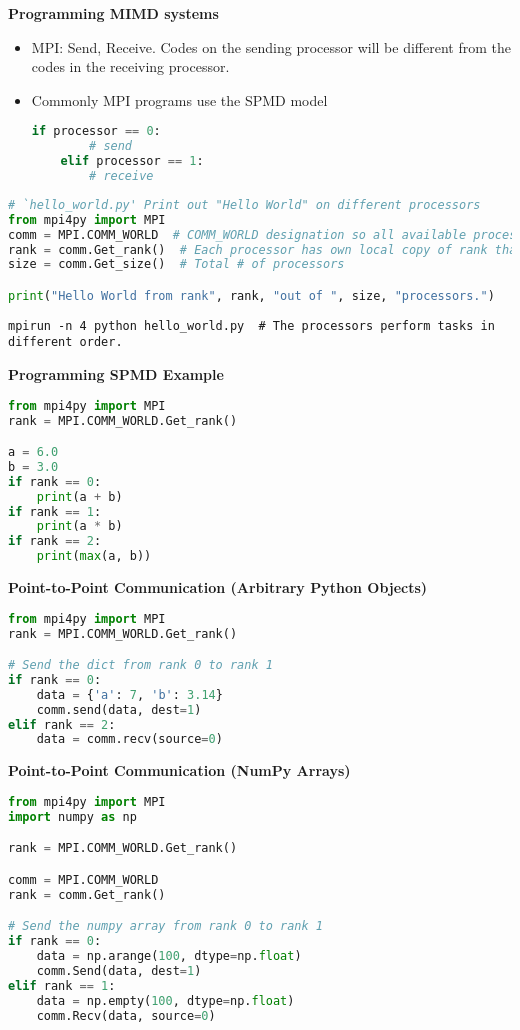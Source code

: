 \documentclass{article}
\begin{document}
\textbf{Programming MIMD systems}
\begin{itemize}
    \item MPI: Send, Receive. Codes on the sending processor will be different from the codes in the receiving processor.
    \item Commonly MPI programs use the SPMD model
    
    \begin{lstlisting}[language=Python]
    if processor == 0:
        # send
    elif processor == 1:
        # receive
    \end{lstlisting}
\end{itemize}

\begin{lstlisting}[language=Python]
# `hello_world.py' Print out "Hello World" on different processors
from mpi4py import MPI
comm = MPI.COMM_WORLD  # COMM_WORLD designation so all available processors communicate with each other 
rank = comm.Get_rank()  # Each processor has own local copy of rank that cannot be accessed by other processors 
size = comm.Get_size()  # Total # of processors

print("Hello World from rank", rank, "out of ", size, "processors.")
\end{lstlisting}
\begin{lstlisting}
mpirun -n 4 python hello_world.py  # The processors perform tasks in different order.
\end{lstlisting}

\textbf{Programming SPMD Example}
\begin{lstlisting}[language=Python]
from mpi4py import MPI
rank = MPI.COMM_WORLD.Get_rank()

a = 6.0
b = 3.0
if rank == 0:
    print(a + b)
if rank == 1:
    print(a * b)
if rank == 2:
    print(max(a, b))
\end{lstlisting}

\textbf{Point-to-Point Communication (Arbitrary Python Objects)}
\begin{lstlisting}[language=Python]
from mpi4py import MPI
rank = MPI.COMM_WORLD.Get_rank()

# Send the dict from rank 0 to rank 1
if rank == 0:
    data = {'a': 7, 'b': 3.14}
    comm.send(data, dest=1)
elif rank == 2:
    data = comm.recv(source=0)
\end{lstlisting}

\textbf{Point-to-Point Communication (NumPy Arrays)}
\begin{lstlisting}[language=Python]
from mpi4py import MPI
import numpy as np

rank = MPI.COMM_WORLD.Get_rank()

comm = MPI.COMM_WORLD
rank = comm.Get_rank()

# Send the numpy array from rank 0 to rank 1
if rank == 0:
    data = np.arange(100, dtype=np.float)
    comm.Send(data, dest=1)
elif rank == 1:
    data = np.empty(100, dtype=np.float)
    comm.Recv(data, source=0)
\end{lstlisting}
\end{document}
